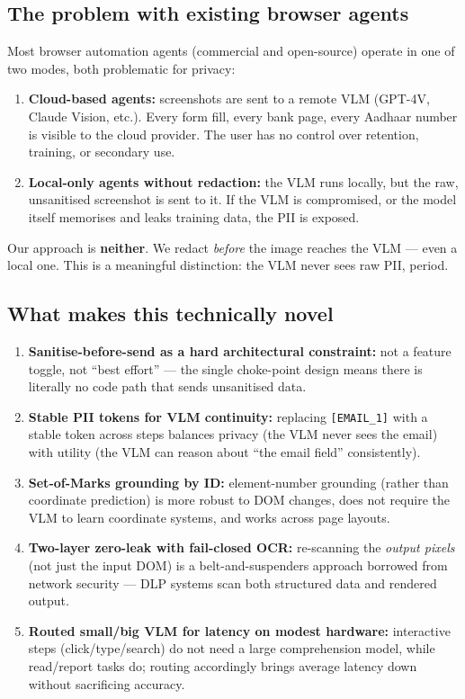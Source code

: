\documentclass[11pt,a4paper]{article}
\newcommand{\code}[1]{\texttt{#1}}
\begin{document}
\subsection{The problem with existing browser agents}
Most browser automation agents (commercial and open-source) operate in one of two modes, both problematic for privacy:
\begin{enumerate}
  \item \textbf{Cloud-based agents:} screenshots are sent to a remote VLM (GPT-4V, Claude Vision, etc.). Every form fill, every bank page, every Aadhaar number is visible to the cloud provider. The user has no control over retention, training, or secondary use.
  \item \textbf{Local-only agents without redaction:} the VLM runs locally, but the raw, unsanitised screenshot is sent to it. If the VLM is compromised, or the model itself memorises and leaks training data, the PII is exposed.
\end{enumerate}

Our approach is \textbf{neither}. We redact \emph{before} the image reaches the VLM --- even a local one. This is a meaningful distinction: the VLM never sees raw PII, period.

\subsection{What makes this technically novel}
\begin{enumerate}
  \item \textbf{Sanitise-before-send as a hard architectural constraint:} not a feature toggle, not ``best effort'' --- the single choke-point design means there is literally no code path that sends unsanitised data.
  \item \textbf{Stable PII tokens for VLM continuity:} replacing \code{[EMAIL\_1]} with a stable token across steps balances privacy (the VLM never sees the email) with utility (the VLM can reason about ``the email field'' consistently).
  \item \textbf{Set-of-Marks grounding by ID:} element-number grounding (rather than coordinate prediction) is more robust to DOM changes, does not require the VLM to learn coordinate systems, and works across page layouts.
  \item \textbf{Two-layer zero-leak with fail-closed OCR:} re-scanning the \emph{output pixels} (not just the input DOM) is a belt-and-suspenders approach borrowed from network security --- DLP systems scan both structured data and rendered output.
  \item \textbf{Routed small/big VLM for latency on modest hardware:} interactive steps (click/type/search) do not need a large comprehension model, while read/report tasks do; routing accordingly brings average latency down without sacrificing accuracy.
\end{enumerate}
\end{document}
